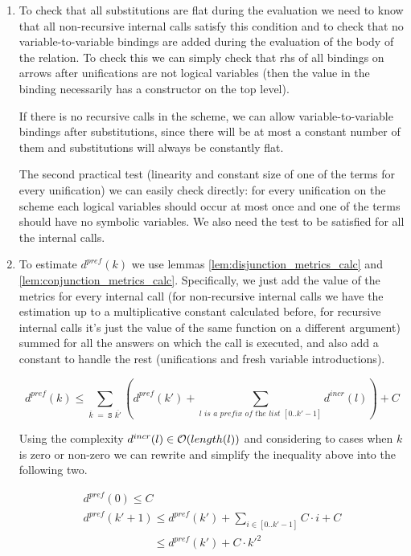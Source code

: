 \begin{enumerate}
\item To check that all substitutions are flat during the evaluation we need to know that all non-recursive internal calls satisfy this condition and to check that no variable-to-variable bindings are added during the evaluation of the body of the relation. To check this we can simply check that rhs of all bindings on arrows after unifications are not logical variables (then the value in the binding
necessarily has a constructor on the top level).

If there is no recursive calls in the scheme, we can allow variable-to-variable bindings after substitutions, since there will be at most a constant number of them and substitutions will always be constantly flat.

The second practical test (linearity and constant size of one of the terms for every unification) we can easily check directly: for every unification on the scheme each logical variables should occur at most once and one of the terms should have no symbolic variables. We also need the test to be satisfied for all the internal calls.

\item To estimate $d^{pref}(k)$ we use lemmas \ref{lem:disjunction_metrics_calc} and \ref{lem:conjunction_metrics_calc}. Specifically, we just add the value of the metrics for every internal call (for non-recursive internal calls we have the estimation up to a multiplicative constant calculated before, for recursive internal calls it's just the value of the same function on a different argument) summed for all the answers on which the call is executed, and also add a constant to handle the rest (unifications and fresh variable introductions).

\[ d^{pref}(k) \le \sum_{\overline{k} \;=\; \texttt{S $\overline{k'}$}} (d^{pref}(k') + \sum_{\textit{$l$ is a prefix of the list $[0..k' - 1]$}} d^{incr}(l)) + C \]

Using the complexity $d^{incr}(l) \in \mathcal{O}(length(l))$ and considering to cases when $k$ is zero or non-zero we can rewrite and simplify the inequality above into the following two.

\[ \begin{array}{l}
d^{pref}(0) \le C \\
d^{pref}(k' + 1) \le d^{pref}(k') + \sum_{i \in [0..k' - 1]} C \cdot i + C \\
\phantom{d^{pref}(k' + 1)} \le d^{pref}(k') + C \cdot k'^2 \\
\end{array} \]


\end{enumerate}
